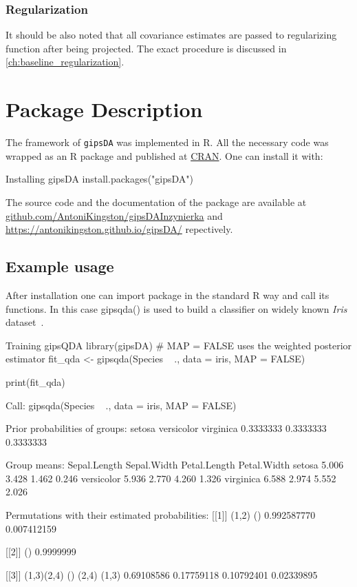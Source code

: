 \documentclass[a4paper,11pt,twoside]{report}
\theoremstyle{definition}
\begin{document}
\subsection{Regularization}
It should be also noted that all covariance estimates are passed to regularizing function after being projected. The exact procedure is discussed in \autoref{ch:baseline_regularization}.






\chapter{Package Description}
The framework of \texttt{gipsDA} was implemented in R. All the necessary code was wrapped as an R package and published at \href{https://cran.r-project.org/}{CRAN}. One can install it with:
\begin{RCode}{Installing gipsDA}
    install.packages("gipsDA")
\end{RCode}


The source code and the documentation of the package are available at  \href{https://github.com/AntoniKingston/gipsDAInzynierka}{github.com/AntoniKingston/gipsDAInzynierka} and \href{https://antonikingston.github.io/gipsDA/}{https://antonikingston.github.io/gipsDA/} repectively.
\section{Example usage}
After installation one can import package in the standard R way and call its functions. In this case gipsqda() is used to build a classifier on widely known \textit{Iris} dataset~\cite{iris_53}.
\begin{RCode}{Training gipsQDA}
library(gipsDA)
# MAP = FALSE uses the weighted posterior estimator
fit_qda <- gipsqda(Species ~ ., data = iris, MAP = FALSE)

print(fit_qda)
\end{RCode}

\begin{ROutput}
Call:
gipsqda(Species ~ ., data = iris, MAP = FALSE)

Prior probabilities of groups:
    setosa versicolor  virginica
 0.3333333  0.3333333  0.3333333

Group means:
           Sepal.Length Sepal.Width Petal.Length Petal.Width
setosa            5.006       3.428        1.462       0.246
versicolor        5.936       2.770        4.260       1.326
virginica         6.588       2.974        5.552       2.026

Permutations with their estimated probabilities:
[[1]]
      (1,2)          ()
0.992587770 0.007412159

[[2]]
       ()
0.9999999

[[3]]
(1,3)(2,4)         ()      (2,4)      (1,3)
0.69108586 0.17759118 0.10792401 0.02339895
\end{ROutput}
\end{document}
